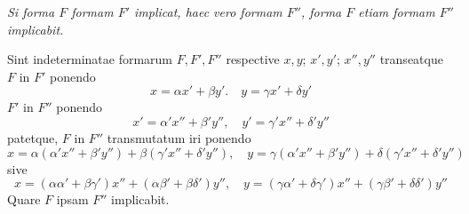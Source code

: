 \textit{Si forma $F$ formam $F'$ implicat, haec vero formam $F''$, forma $F$ etiam formam $F''$ implicabit.}

Sint indeterminatae formarum $F,F',F''$ respective $x,y$; $x',y'$; $x'',y''$ transeatque $F$ in $F'$ ponendo
\[
x=\alpha x'+\beta y'.\quad y=\gamma x'+\delta y'
\]
$F'$ in $F''$ ponendo
\[
x'=\alpha'x''+\beta'y'',\quad y'=\gamma'x''+\delta'y''
\]
patetque, $F$ in $F''$ transmutatum iri ponendo
\[
x=\alpha(\alpha'x''+\beta'y'')+\beta(\gamma'x''+\delta'y''),\quad
y=\gamma(\alpha'x''+\beta'y'')+\delta(\gamma'x''+\delta'y'')
\]
sive
\[
x=(\alpha\alpha'+\beta\gamma')x''+(\alpha\beta'+\beta\delta')y'',\quad
y=(\gamma\alpha'+\delta\gamma')x''+(\gamma\beta'+\delta\delta')y''
\]
Quare $F$ ipsam $F''$ implicabit.

